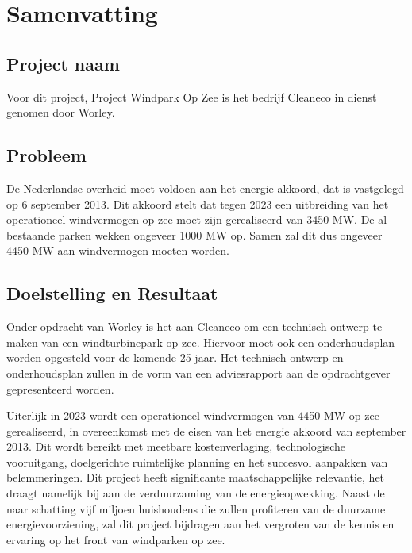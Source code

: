 \section{Samenvatting}
\subsection{Project naam}
Voor dit project, Project Windpark Op Zee is het bedrijf Cleaneco in dienst genomen door Worley. 

\subsection{Probleem}
De Nederlandse overheid moet voldoen aan het \gls{energie akkoord}\cite{energieakkoord}, dat is vastgelegd op 6 september 2013. Dit akkoord stelt dat tegen 2023 een uitbreiding van het operationeel windvermogen op zee moet zijn gerealiseerd van 3450 MW. De al bestaande parken wekken ongeveer 1000 MW op. Samen zal dit dus ongeveer 4450 MW aan windvermogen moeten worden.


\subsection{Doelstelling en Resultaat}
Onder opdracht van Worley is het aan Cleaneco om een technisch ontwerp te maken van een windturbinepark op zee. Hiervoor moet ook een onderhoudsplan worden opgesteld voor de komende 25 jaar. Het technisch ontwerp en onderhoudsplan zullen in de vorm van een adviesrapport aan de opdrachtgever gepresenteerd worden.

Uiterlijk in 2023 wordt een operationeel windvermogen van 4450 MW op zee gerealiseerd, in overeenkomst met de eisen van het \gls{energie akkoord}\cite{energieakkoord} van september 2013. Dit wordt bereikt met meetbare kostenverlaging, technologische vooruitgang, doelgerichte ruimtelijke planning en het succesvol aanpakken van belemmeringen. Dit project heeft significante maatschappelijke relevantie, het draagt namelijk bij aan de verduurzaming van de energieopwekking. Naast de naar schatting vijf miljoen\cite{energieakkoord} huishoudens die zullen profiteren van de duurzame energievoorziening, zal dit project bijdragen aan het vergroten van de kennis en ervaring op het front van windparken op zee.  


